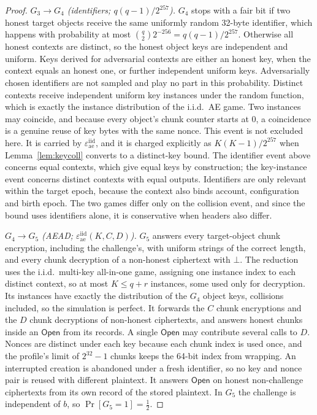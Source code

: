 \documentclass[pdflatex,sn-mathphys-num,twocolumn]{sn-jnl}
\theoremstyle{plain}
\theoremstyle{definition}
\begin{document}
\begin{proof}
\emph{$G_3\to G_4$ (identifiers; $q(q-1)/2^{257}$).} $G_4$ stops with a fair bit if two honest target objects receive the same uniformly random 32-byte identifier, which happens with probability at most $\binom q2 2^{-256}=q(q-1)/2^{257}$. Otherwise all honest contexts are distinct, so the honest object keys are independent and uniform. Keys derived for adversarial contexts are either an honest key, when the context equals an honest one, or further independent uniform keys. Adversarially chosen identifiers are not sampled and play no part in this probability. Distinct contexts receive independent uniform key instances under the random function, which is exactly the instance distribution of the i.i.d.\ AE game. Two instances may coincide, and because every object's chunk counter starts at $0$, a coincidence is a genuine reuse of key bytes with the same nonce. This event is not excluded here. It is carried by $\varepsilon^{\mathrm{iid}}_{\mathrm{ae}}$, and it is charged explicitly as $K(K-1)/2^{257}$ when Lemma~\ref{lem:keycoll} converts to a distinct-key bound. The identifier event above concerns equal contexts, which give equal keys by construction; the key-instance event concerns distinct contexts with equal outputs. Identifiers are only relevant within the target epoch, because the context also binds account, configuration and birth epoch. The two games differ only on the collision event, and since the bound uses identifiers alone, it is conservative when headers also differ.

\emph{$G_4\to G_5$ (AEAD; $\varepsilon^{\mathrm{iid}}_{\mathrm{ae}}(K,C,D)$).} $G_5$ answers every target-object chunk encryption, including the challenge's, with uniform strings of the correct length, and every chunk decryption of a non-honest ciphertext with $\bot$. The reduction uses the i.i.d.\ multi-key all-in-one game, assigning one instance index to each distinct context, so at most $K\le q+r$ instances, some used only for decryption. Its instances have exactly the distribution of the $G_4$ object keys, collisions included, so the simulation is perfect. It forwards the $C$ chunk encryptions and the $D$ chunk decryptions of non-honest ciphertexts, and answers honest chunks inside an $\mathsf{Open}$ from its records. A single $\mathsf{Open}$ may contribute several calls to $D$. Nonces are distinct under each key because each chunk index is used once, and the profile's limit of $2^{32}-1$ chunks keeps the 64-bit index from wrapping. An interrupted creation is abandoned under a fresh identifier, so no key and nonce pair is reused with different plaintext. It answers $\mathsf{Open}$ on honest non-challenge ciphertexts from its own record of the stored plaintext. In $G_5$ the challenge is independent of $b$, so $\Pr[G_5=1]=\tfrac12$.


\end{proof}
\end{document}
